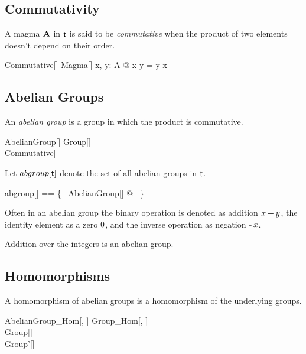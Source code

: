 \documentclass{amsart}
\begin{document}
\subsection{Commutativity}

A magma $\mathbf{A}$ in $\mathsf{t}$ is said to be {\em commutative} when the product of two elements doesn't depend on 
their order.
\begin{schema}{Commutative}[\genT]
	Magma[\genT]
\where
	\forall x, y: A @ x \opG y = y \opG x
\end{schema}

\subsection{Abelian Groups}

An \textit{abelian group} is a group in which the product is commutative.

\begin{schema}{AbelianGroup}[\genT]
	Group[\genT] \\
	Commutative[\genT]
\end{schema}

Let $abgroup[\mathsf{t}]$ denote the set of all abelian groups in $\mathsf{t}$.
\begin{zed}
	abgroup[\genT] == \{~ AbelianGroup[\genT] @ \strucA ~\}
\end{zed}

Often in an abelian group the binary operation is denoted as addition $x \mathbin{+} y$,
the identity element as a zero $0$, and the inverse operation as negation $\operatorname{-} x$.

\begin{example}
Addition over the integers is an abelian group.


\end{example}

\subsection{Homomorphisms}

A homomorphism of abelian groups is a homomorphism of the underlying groups.

\begin{schema}{AbelianGroup\_Hom}[\genT, \genU]
	Group\_Hom[\genT, \genU] \\
	Group[\genT] \\
	Group'[\genU]
\end{schema}
\end{document}
